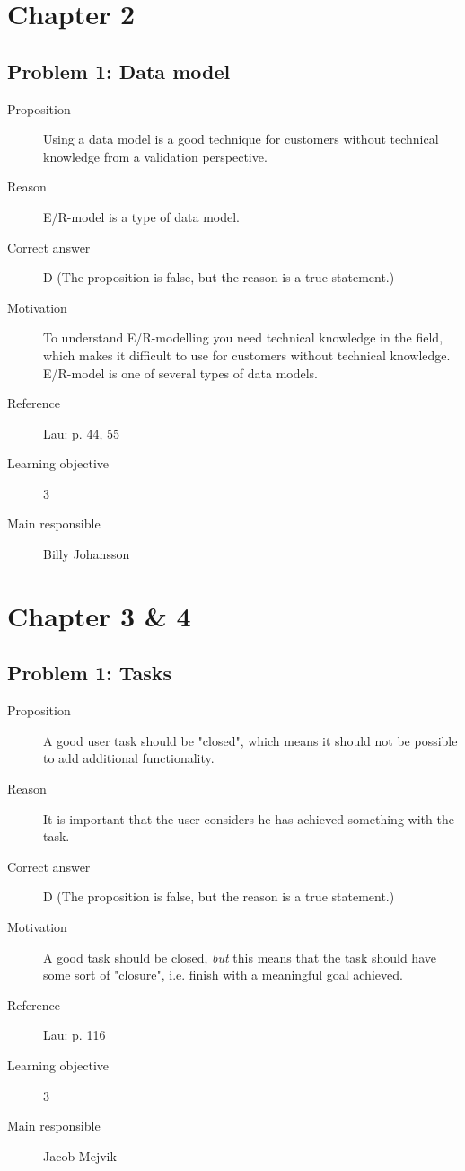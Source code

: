 \documentclass[10pt,a4paper]{article}
\begin{document}
\section*{Chapter 2}
\subsection*{Problem 1: Data model}
\begin{description}
\item[Proposition] Using a data model is a good technique for customers without technical knowledge from a validation perspective. 
\item[Reason] E/R-model is a type of data model.
\item[Correct answer] D (The proposition is false, but the reason is a true statement.)
\item[Motivation] To understand E/R-modelling you need technical knowledge in the field, which makes it difficult to use for customers without technical knowledge. E/R-model is one of several types of data models. 
\item[Reference] Lau: p. 44, 55
\item[Learning objective] 3
\item[Main responsible] Billy Johansson
\end{description}

\section*{Chapter 3 \& 4}
\subsection*{Problem 1: Tasks}
\begin{description} 
\item[Proposition] A good user task should be "closed", which means it should not be possible to add additional functionality. 
\item[Reason] It is important that the user considers he has achieved something with the task. 
\item[Correct answer] D (The proposition is false, but the reason is a true statement.)
\item[Motivation] A good task should be closed, \textit{but} this means that the task should have some sort of "closure", i.e. finish with a meaningful goal achieved. 
\item[Reference] Lau: p. 116
\item[Learning objective] 3
\item[Main responsible] Jacob Mejvik
\end{description}
\end{document}
